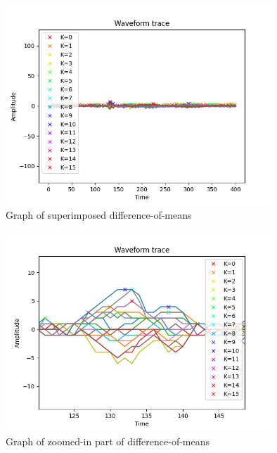 \documentclass[1p,16pt]{elsarticle}
\begin{document}
\begin{figure}[hb]
	\centering
    \centerline{\includegraphics[width=10cm]{peaks_plot}}
    \caption{Graph of superimposed difference-of-means}\label{fig:peaks_plot}
\end{figure}

\begin{figure}[hb]
	\centering
    \centerline{\includegraphics[width=10cm]{peak_plot}}
    \caption{Graph of zoomed-in part of difference-of-means}\label{fig:peak_plot}
\end{figure}

%
\end{document}
